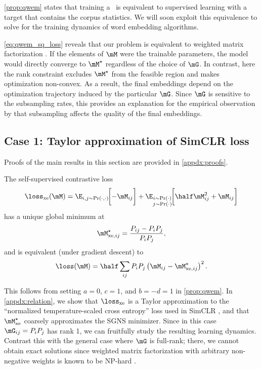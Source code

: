 \cref{prop:qwem} states that training a \wem\ is equivalent to supervised learning with a target that contains the corpus statistics. We will soon exploit this equivalence to solve for the training dynamics of word embedding algorithms.

\clearpage

\cref{eq:qwem_sq_loss} reveals that our problem is equivalent to weighted matrix factorization \citep{srebro2003weighted}.
If the elements of $\M$ were the trainable parameters, the model would directly converge to $\Mstar$ regardless of the choice of $\mG$.
In contrast, here the rank constraint excludes $\Mstar$ from the feasible region and makes optimization non-convex.
As a result, the final embeddings depend on the optimization trajectory induced by the particular $\mG$. Since $\mG$ is sensitive to the subsampling rates, this provides an explanation for the empirical observation by \cite{mikolov2013distributed} that subsampling affects the quality of the final embeddings.

\subsection{Case 1: Taylor approximation of SimCLR loss}

Proofs of the main results in this section are provided in \cref{appdx:proofs}.

\begin{corollary}
    The self-supervised contrastive loss
    \begin{equation}
        \lossxe(\M) = \E_{i,j\sim \Pr(\cdot,\cdot)}\!\bigg[{-\M_{ij}}\bigg]
        + \E_{\substack{i\sim \Pr(\cdot)\\j\sim \Pr(\cdot)}}\!\bigg[{\half\M_{ij}^2 +\M_{ij}}\bigg]
        \label{eq:qwem_xe}
    \end{equation}
    has a unique global minimum at
    \begin{equation}
        \Mstarxeij = \frac{P_{ij}-P_i P_j}{P_i P_j},
    \end{equation}
    and is equivalent (under gradient descent) to
    \begin{equation}
        \loss(\M) = \half\sum_{ij} P_i P_j \left(\M_{ij}-\Mstarxeij\right)^2.
    \end{equation}
    \label{cor:qwem_xe}
\end{corollary}
This follows from setting $a=0$, $c=1$, and $b=-d=1$ in \cref{prop:qwem}. In \cref{appdx:relation}, we show that $\lossxe$ is a Taylor approximation to the ``normalized temperature-scaled cross entropy'' loss used in SimCLR \citep{chen2020simple}, and that $\Mstarxe$ coarsely approximates the SGNS minimizer. Since in this case $\mG_{ij}=P_i P_j$ has rank 1, we can fruitfully study the resulting learning dynamics. Contrast this with the general case where $\mG$ is full-rank; there, we cannot obtain exact solutions since weighted matrix factorization with arbitrary non-negative weights is known to be NP-hard \citep{gillis2011low}.

